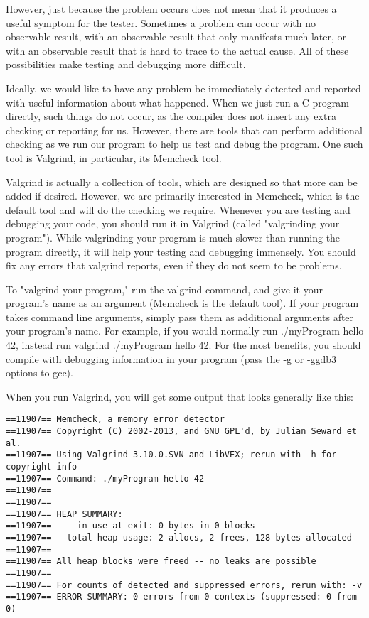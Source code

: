 \documentclass[11pt, a4paper]{article}
\begin{document}
However, just because the problem occurs does not mean that it produces a useful symptom for the tester. Sometimes a problem can occur with no observable result, with an observable result that only manifests much later, or with an observable result that is hard to trace to the actual cause. All of these possibilities make testing and debugging more difficult.

Ideally, we would like to have any problem be immediately detected and reported with useful information about what happened. When we just run a C program directly, such things do not occur, as the compiler does not insert any extra checking or reporting for us. However, there are tools that can perform additional checking as we run our program to help us test and debug the program. One such tool is Valgrind, in particular, its Memcheck tool.

Valgrind is actually a collection of tools, which are designed so that more can be added if desired. However, we are primarily interested in Memcheck, which is the default tool and will do the checking we require. Whenever you are testing and debugging your code, you should run it in Valgrind (called "valgrinding your program"). While valgrinding your program is much slower than running the program directly, it will help your testing and debugging immensely. You should fix any errors that valgrind reports, even if they do not seem to be problems.

To "valgrind your program," run the valgrind command, and give it your program's name as an argument (Memcheck is the default tool). If your program takes command line arguments, simply pass them as additional arguments after your program’s name. For example, if you would normally run ./myProgram hello 42, instead run valgrind ./myProgram hello 42. For the most benefits, you should compile with debugging information in your program (pass the -g or -ggdb3 options to gcc).

When you run Valgrind, you will get some output that looks generally like this:


\begin{Verbatim}
==11907== Memcheck, a memory error detector
==11907== Copyright (C) 2002-2013, and GNU GPL'd, by Julian Seward et al.
==11907== Using Valgrind-3.10.0.SVN and LibVEX; rerun with -h for copyright info
==11907== Command: ./myProgram hello 42
==11907==
==11907==
==11907== HEAP SUMMARY:
==11907==     in use at exit: 0 bytes in 0 blocks
==11907==   total heap usage: 2 allocs, 2 frees, 128 bytes allocated
==11907==
==11907== All heap blocks were freed -- no leaks are possible
==11907==
==11907== For counts of detected and suppressed errors, rerun with: -v
==11907== ERROR SUMMARY: 0 errors from 0 contexts (suppressed: 0 from 0)
\end{Verbatim}
\end{document}

